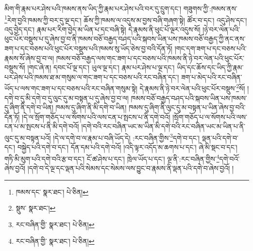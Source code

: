 མིག་གི་རྣམ་པར་ཤེས་པའི་ཁམས་ནས་ཡིད་ཀྱི་རྣམ་པར་ཤེས་པའི་བར་དུ་དྲུག་དང་། གཟུགས་ཀྱི་:ཁམས་ནས་\footnote{ཁམས་དང་  སྣར་ཐང་།  པེ་ཅིན། }རེག་བྱའི་ཁམས་ཀྱི་བར་དུ་ལྔ་དང་། ཆོས་ཀྱི་ཁམས་ལ་འདུས་མ་བྱས་བཞི་གཞག་སྟེ། ཚོར་བ་དང་། འདུ་ཤེས་དང་། འདུ་བྱེད་དང་། རྣམ་པར་རིག་བྱེད་མ་ཡིན་པ་དང་བཞི་སྟེ། དེ་རྣམས་ནི་ཕུང་པོ་ལྔར་འདུས་སོ། །ཉེ་བར་ལེན་པའི་ཕུང་པོར་བསྡུས་པ་དུ་ཞེས་བྱ་བ་ནི་ཁམས་བཅོ་བརྒྱད་བཤད་པའི་སྐབས་ཡིན་པས་ཁམས་བཅོ་བརྒྱད་ཀྱི་ནང་ནས་ཟག་པ་དང་བཅས་པའི་ཕུང་པོར་བསྡུས་པའི་ཁམས་སུ་ཡོད་ཅེས་བྱ་བའི་དོན་ཏོ། །གང་དག་ཟག་པ་དང་བཅས་པའི་རྣམས་སོ་ཞེས་བྱ་བ་ལ། ཁམས་བཅོ་བརྒྱད་ལས་གང་ཟག་པ་དང་བཅས་པའི་ཁམས་ནི་ཉེ་བར་ལེན་པའི་ཕུང་པོར་བསྡུས་སོ། །གང་ཞེ་ན། དབང་པོ་ལྔ་དང་། ཡུལ་ལྔ་དང་། རྣམ་པར་ཤེས་པ་ལྔ་དང་། ཡིད་དང་ཆོས་དང་ཡིད་ཀྱི་རྣམ་པར་ཤེས་པའི་ཁམས་ཐ་མ་གསུམ་ལ་གང་ཟག་པ་དང་བཅས་པའི་རང་བཞིན་དང་། ཟག་པ་མེད་པའི་རང་བཞིན་ཡོད་པ་ལས་གང་ཟག་པ་དང་བཅས་པའི་རང་བཞིན་གསུམ་སྟེ། དེ་རྣམས་ནི་ཉེ་བར་ལེན་པའི་ཕུང་པོར་བསྡུས་\footnote{སྡུས་  སྣར་ཐང་། }སོ། །དགེ་བ་དུ་མི་དགེ་བ་དུ་ལུང་དུ་མ་བསྟན་པ་དུ་ཞེས་བྱ་བ་ལ། ཁམས་བཅོ་བརྒྱད་བཤད་པའི་སྐབས་ཡིན་པས་ཁམས་དུ་ཞིག་ནི་དགེ་བ་ཡིན། ཁམས་དུ་ཞིག་ནི་མི་དགེ་བ་ཡིན། ཁམས་དུ་ཞིག་ནི་ལུང་དུ་མ་བསྟན་པ་ཡིན་ཞེས་བྱ་བའི་དོན་ཏོ། །དེ་ལ་སྲོག་གཅོད་པ་ལ་སོགས་པའི་ལས་ངན་པ་སྤངས་པ་ནི་དགེ་བའོ། །སྲོག་གཅོད་པ་ལ་སོགས་པའི་ལས་ངན་པ་མ་སྤངས་པ་ནི་མི་དགེ་བའོ། །དགེ་བའི་རང་བཞིན་ཡང་མ་ཡིན་མི་དགེ་བའི་རང་བཞིན་ཡང་མ་ཡིན་པ་ནི་ལུང་དུ་མ་བསྟན་པའོ། །དེ་ལ་དགེ་བ་ལ་རྣམ་པ་བཞི་ཡོད་དེ། :རང་བཞིན་གྱིས་\footnote{རང་བཞིན་གྱི་  སྣར་ཐང་།  པེ་ཅིན། }དགེ་བ་དང་། ལྡན་པའི་དགེ་བ་དང་། བསྐྱེད་པའི་དགེ་བ་དང་། དོན་དམ་པའི་དགེ་བའོ། །འདི་ལྟར་འདོད་མ་ཆགས་པ་དང་། ཞེ་མི་སྡང་བ་དང་། གཏི་མི་མུག་པའི་དགེ་བའི་རྩ་བ་དང་། ངོ་ཚ་ཤེས་པ་དང་། ཁྲེལ་ཡོད་པ་དང་། ལྔ་ནི་:རང་བཞིན་གྱིས་\footnote{རང་བཞིན་གྱི་  སྣར་ཐང་།  པེ་ཅིན། }དགེ་བའོ་ཞེས་བྱའོ། །དགེ་བ་དེ་ལྔ་དང་ལྡན་པའི་སེམས་དང་སེམས་ལས་བྱུང་བ་རྣམས་ནི་ལྡན་པའི་དགེ་བ་ཞེས་བྱའོ། །
